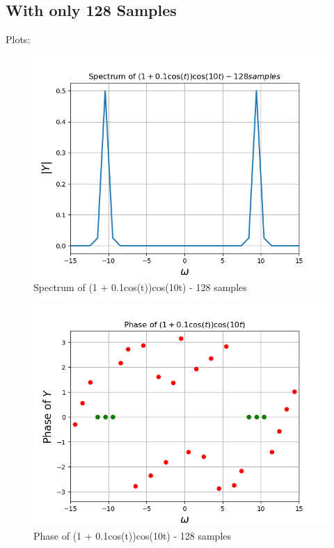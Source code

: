 \documentclass[11pt]{article}
\begin{document}
\subsection{With only 128 Samples}
Plots:
\begin{figure}[H]
    \centering
    \includegraphics[scale = 0.75]{Figure_2a.png}
    \caption{Spectrum of (1 + 0.1cos(t))cos(10t) - 128 samples}
\end{figure}
\begin{figure}[H]
    \centering
    \includegraphics[scale = 0.75]{Figure_2b.png}
    \caption{Phase of (1 + 0.1cos(t))cos(10t) - 128 samples}
\end{figure}
\end{document}
